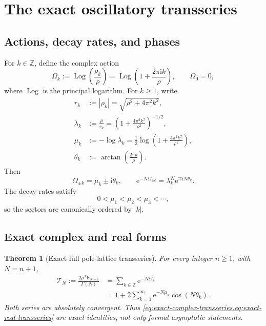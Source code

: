 \documentclass[11pt,oneside]{article}
\numberwithin{equation}{section}
\newtheorem{theorem}{Theorem}[section]
\newcommand{\e}{\mathrm e}
\newcommand{\ii}{\mathrm i}
\newcommand{\Z}{\mathbb Z}
\newcommand{\Fub}{\mathsf F}
\newcommand{\Log}{\operatorname{Log}}
\newcommand{\abs}[1]{\left|#1\right|}
\newcommand{\paren}[1]{\left(#1\right)}
\begin{document}
\section{The exact oscillatory transseries}
\label{sec:transseries}

\subsection{Actions, decay rates, and phases}

For \(k\in\Z\), define the complex action
\begin{equation}
 \Omega_k:=\Log\!\paren{\frac{\rho_k}{\rho}}
 =\Log\!\paren{1+\frac{2\pi\ii k}{\rho}},
 \qquad \Omega_0=0,
 \label{eq:action-definition}
\end{equation}
where \(\Log\) is the principal logarithm.  For \(k\ge1\), write
\begin{align}
 r_k&:=\abs{\rho_k}=\sqrt{\rho^2+4\pi^2k^2},
 \label{eq:rk}\\
 \lambda_k&:=\frac{\rho}{r_k}
 =\paren{1+\frac{4\pi^2k^2}{\rho^2}}^{-1/2},
 \label{eq:lambdak}\\
 \mu_k&:=-\log\lambda_k
 =\frac12\log\!\paren{1+\frac{4\pi^2k^2}{\rho^2}},
 \label{eq:muk}\\
 \theta_k&:=\arctan\!\paren{\frac{2\pi k}{\rho}}.
 \label{eq:thetak}
\end{align}
Then
\begin{equation}
 \Omega_{\pm k}=\mu_k\pm\ii\theta_k,
 \qquad
 \e^{-N\Omega_{\pm k}}
 =\lambda_k^N\e^{\mp\ii N\theta_k}.
 \label{eq:action-polar}
\end{equation}
The decay rates satisfy
\[
 0<\mu_1<\mu_2<\mu_3<\cdots,
\]
so the sectors are canonically ordered by \(\abs{k}\).

\subsection{Exact complex and real forms}

\begin{theorem}[Exact full pole-lattice transseries]
\label{thm:exact-transseries}
For every integer \(n\ge1\), with \(N=n+1\),
\begin{align}
 \mathscr T_N
 :=\frac{2\rho^N\Fub_{N-1}}{\Gamma(N)}
 &=\sum_{k\in\Z}\e^{-N\Omega_k}
 \label{eq:exact-complex-transseries}\\
 &=1+2\sum_{k=1}^{\infty}
 \e^{-N\mu_k}\cos(N\theta_k).
 \label{eq:exact-real-transseries}
\end{align}
Both series are absolutely convergent.  Thus \cref{eq:exact-complex-transseries,eq:exact-real-transseries} are exact identities, not only formal asymptotic statements.
\end{theorem}
\end{document}

